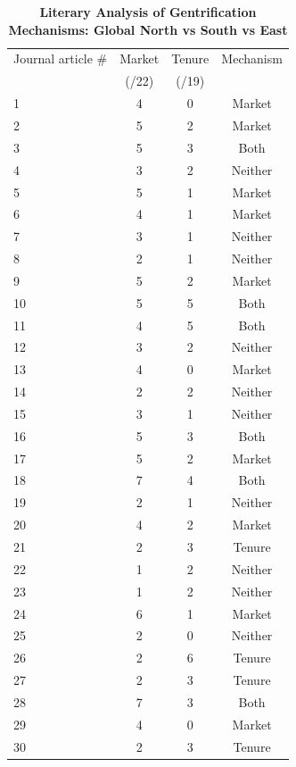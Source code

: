 \documentclass[12pt]{article}
\begin{document}
\newpage

\begin{table}[H]
    \centering
    \footnotesize
    \caption{\textbf{Literary Analysis of Gentrification Mechanisms: Global North vs South vs East}}
	\begin{tabular}{lccc} 
		\hline
		Journal article \# & Market & Tenure & Mechanism\\
		  & (/22) & (/19) & \\
		\hline
        1 & 4 & 0 & Market\\
        2 & 5 & 2 & Market\\
        3 & 5 & 3 & Both\\
        4 & 3 & 2 & Neither\\
        5 & 5 & 1 & Market\\
        6 & 4 & 1 & Market\\
        7 & 3 & 1 & Neither\\
        8 & 2 & 1 & Neither\\
        9 & 5 & 2 & Market\\
        10 & 5 & 5 & Both\\
        11 & 4 & 5 & Both\\
        12 & 3 & 2 & Neither\\
        13 & 4 & 0 & Market\\
        14 & 2 & 2 & Neither\\
        15 & 3 & 1 & Neither\\
        16 & 5 & 3 & Both\\
        17 & 5 & 2 & Market\\
        18 & 7 & 4 & Both\\
        19 & 2 & 1 & Neither\\
        20 & 4 & 2 & Market\\
        21 & 2 & 3 & Tenure\\
        22 & 1 & 2 & Neither\\
        23 & 1 & 2 & Neither\\
        24 & 6 & 1 & Market\\
        25 & 2 & 0 & Neither\\
        26 & 2 & 6 & Tenure\\
        27 & 2 & 3 & Tenure\\
        28 & 7 & 3 & Both\\
        29 & 4 & 0 & Market\\
        30 & 2 & 3 & Tenure\\
		\hline
	\end{tabular}
\end{table}
\end{document}

